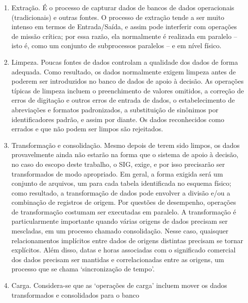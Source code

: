 \documentclass[a4paper]{article}
\newcommand\liststyleWWviiiNumxxvi{%
\renewcommand\theenumi{\alph{enumi}}
\renewcommand\theenumii{\alph{enumii}}
\renewcommand\theenumiii{\roman{enumiii}}
\renewcommand\theenumiv{\arabic{enumiv}}
\renewcommand\labelenumi{\theenumi)}
\renewcommand\labelenumii{\theenumii.}
\renewcommand\labelenumiii{\theenumiii.}
\renewcommand\labelenumiv{\theenumiv.}
}
\begin{document}
\liststyleWWviiiNumxxvi
\begin{enumerate}
\item {\sffamily
Extra\c{c}\~ao. \'E o processo de capturar dados de bancos de dados operacionais (tradicionais) e outras fontes. O
processo de extra\c{c}\~ao tende a ser muito intenso em termos de Entrada/Sa\'ida, e assim pode interferir com
opera\c{c}\~oes de miss\~ao cr\'itica; por essa raz\~ao, ela normalmente \'e realizada em paralelo -- isto \'e, como um
conjunto de subprocessos paralelos -- e em n\'ivel f\'isico.}
\item {\sffamily
Limpeza. Poucas fontes de dados controlam a qualidade dos dados de forma adequada. Como resultado, os dados normalmente
exigem limpeza antes de poderem ser introduzidos no banco de dados de apoio \`a decis\~ao. As opera\c{c}\~oes t\'ipicas
de limpeza incluem o preenchimento de valores omitidos, a corre\c{c}\~ao de erros de digita\c{c}\~ao e outros erros de
entrada de dados, o estabelecimento de abrevia\c{c}\~oes e formatos padronizados, a substitui\c{c}\~ao de sin\^onimos
por identificadores padr\~ao, e assim por diante. Os dados reconhecidos como errados e que n\~ao podem ser limpos s\~ao
rejeitados.}
\item {\sffamily
Transforma\c{c}\~ao e consolida\c{c}\~ao. Mesmo depois de terem sido limpos, os dados provavelmente ainda n\~ao
estar\~ao na forma que o sistema de apoio \`a decis\~ao, no caso do escopo deste trabalho, o SIG, exige, e por isso
precisar\~ao ser transformados de modo apropriado. Em geral, a forma exigida ser\'a um conjunto de arquivos, um para
cada tabela identificada no esquema f\'isico; como resultado, a transforma\c{c}\~ao de dados pode envolver a divis\~ao
e/ou a combina\c{c}\~ao de registros de origem. Por quest\~oes de desempenho, opera\c{c}\~oes de transforma\c{c}\~ao
costumam ser executadas em paralelo. A transforma\c{c}\~ao \'e particularmente importante quando v\'arias origens de
dados precisam ser mescladas, em um processo chamado consolida\c{c}\~ao. Nesse caso, quaisquer relacionamentos
impl\'icitos entre dados de origens distintas precisam se tornar expl\'icitos. Al\'em disso, datas e horas associadas
com o significado comercial dos dados precisam ser mantidas e correlacionadas entre as origens, um processo que se
chama `sincroniza\c{c}\~ao de tempo'.}
\item {\sffamily
Carga. Considera-se que as `opera\c{c}\~oes de carga' incluem mover os dados transformados e consolidados para o banco
}
\end{enumerate}
\end{document}
